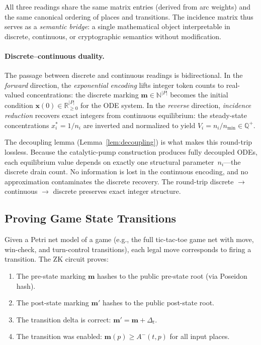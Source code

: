 \documentclass[11pt,a4paper]{article}
\newcommand{\R}{\mathbb{R}}
\newcommand{\N}{\mathbb{N}}
\begin{document}
All three readings share the same matrix entries (derived from arc weights) and the same canonical ordering of places and transitions.
The incidence matrix thus serves as a \emph{semantic bridge}: a single mathematical object interpretable in discrete, continuous, or cryptographic semantics without modification.

\paragraph{Discrete--continuous duality.}
The passage between discrete and continuous readings is bidirectional.
In the \emph{forward} direction, the \emph{exponential encoding} lifts integer token counts to real-valued concentrations: the discrete marking $\mathbf{m} \in \N^{|P|}$ becomes the initial condition $\mathbf{x}(0) \in \R_{\geq 0}^{|P|}$ for the ODE system.
In the \emph{reverse} direction, \emph{incidence reduction} recovers exact integers from continuous equilibrium: the steady-state concentrations $x_i^* = 1/n_i$ are inverted and normalized to yield $V_i = n_i/n_{\min} \in \mathbb{Q}^+$.

The decoupling lemma (Lemma~\ref{lem:decoupling}) is what makes this round-trip lossless.
Because the catalytic-pump construction produces fully decoupled ODEs, each equilibrium value depends on exactly one structural parameter~$n_i$---the discrete drain count.
No information is lost in the continuous encoding, and no approximation contaminates the discrete recovery.
The round-trip discrete $\to$ continuous $\to$ discrete preserves exact integer structure.

\subsection{Proving Game State Transitions}

Given a Petri net model of a game (e.g., the full tic-tac-toe game net with move, win-check, and turn-control transitions), each legal move corresponds to firing a transition.
The ZK circuit proves:
\begin{enumerate}
  \item The pre-state marking $\mathbf{m}$ hashes to the public pre-state root (via Poseidon hash).
  \item The post-state marking $\mathbf{m}'$ hashes to the public post-state root.
  \item The transition delta is correct: $\mathbf{m}' = \mathbf{m} + \Delta_t$.
  \item The transition was enabled: $\mathbf{m}(p) \geq A^-(t,p)$ for all input places.
\end{enumerate}
\end{document}
